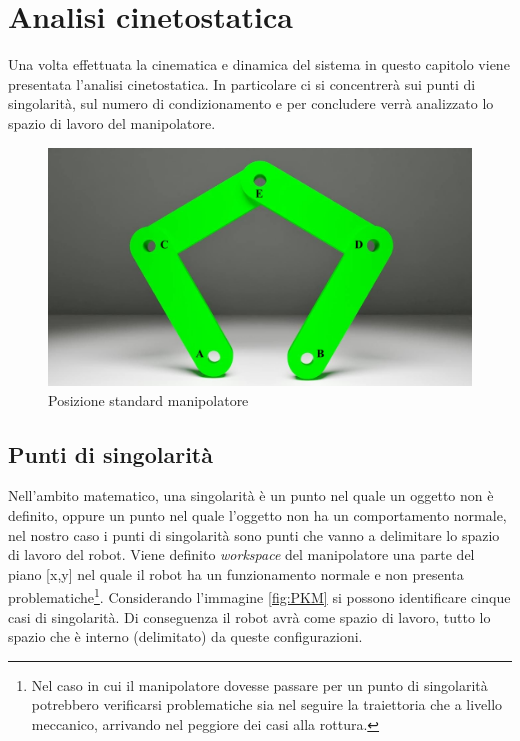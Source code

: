 \section{Analisi cinetostatica}
Una volta effettuata la cinematica e dinamica del sistema in questo capitolo viene presentata l'analisi cinetostatica. In particolare ci si concentrerà sui punti di singolarità, sul numero di condizionamento e per concludere verrà analizzato lo spazio di lavoro del manipolatore.
\begin{figure}[ht]
	\begin{center}
		\includegraphics[scale=0.3]{Immagini/Singolarity/0}
		\caption{Posizione standard manipolatore}
	\end{center}
\end{figure}
\subsection{Punti di singolarità}\label{puntiSingcap}
Nell'ambito matematico, una singolarità è un punto nel quale un oggetto non è definito, oppure un punto nel quale l'oggetto non ha un comportamento normale, nel nostro caso i punti di singolarità sono punti che vanno a delimitare lo spazio di lavoro del robot. Viene definito \textit{workspace} del manipolatore una parte del piano [x,y] nel quale il robot ha un funzionamento normale e non presenta problematiche\footnote{Nel caso in cui il manipolatore dovesse passare per un punto di singolarità potrebbero verificarsi problematiche sia nel seguire la traiettoria che a livello meccanico, arrivando nel peggiore dei casi alla rottura.}. Considerando l'immagine \ref{fig:PKM} si possono identificare cinque casi di singolarità. Di conseguenza il robot avrà come spazio di lavoro, tutto lo spazio che è interno (delimitato) da queste configurazioni.
